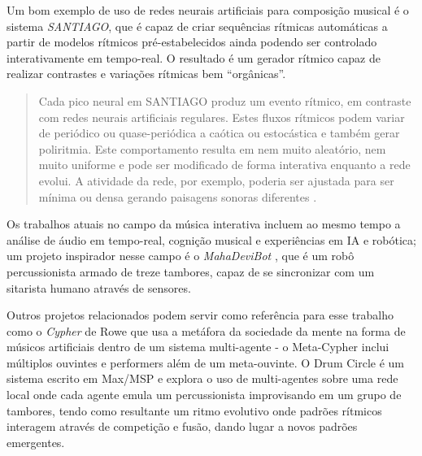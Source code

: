 \documentclass{ppgmus}
\begin{document}
Um bom exemplo de uso de redes neurais artificiais para composição musical é o sistema
\textit{SANTIAGO}, que é capaz de criar sequências rítmicas automáticas
a partir de modelos rítmicos pré-estabelecidos ainda podendo ser controlado 
interativamente em tempo-real. O resultado é um gerador rítmico capaz de realizar
contrastes e variações rítmicas bem ``orgânicas''.
 
\begin{quote}
Cada pico neural em SANTIAGO produz um evento rítmico, em contraste com redes neurais artificiais regulares.
Estes fluxos rítmicos podem variar de periódico ou quase-periódica  a caótica ou estocástica e também gerar poliritmia.
Este comportamento resulta em nem muito aleatório, nem muito uniforme e pode ser modificado de forma interativa enquanto a rede evolui.
A atividade da rede, por exemplo, poderia ser ajustada para ser mínima ou densa gerando paisagens sonoras diferentes
\cite{santiago}.
\end{quote}

 
Os trabalhos atuais no campo da música interativa incluem ao mesmo tempo a análise de áudio
em tempo-real, cognição musical e experiências em IA e robótica; um
projeto inspirador nesse campo é o \textit{MahaDeviBot} \cite{kapur07:integrating}, que
é um robô percussionista armado de treze tambores, capaz de se
sincronizar com um sitarista humano através de sensores.

Outros projetos relacionados podem servir como referência para
esse trabalho como o \textit{Cypher} \cite{rowe93:interactive} de Rowe que usa a metáfora da
sociedade da mente \cite{minsky1988society} na forma de músicos artificiais dentro de
um sistema multi-agente - o Meta-Cypher inclui múltiplos ouvintes e
performers além de um meta-ouvinte.  O Drum Circle \cite{eigenfeld07:drum} é um sistema escrito em Max/MSP e explora o uso de
multi-agentes sobre uma rede local onde cada agente emula um
percussionista improvisando em um grupo de tambores, tendo como
resultante um ritmo evolutivo onde padrões rítmicos interagem
através de competição e fusão, dando lugar a novos padrões
emergentes.
\end{document}
